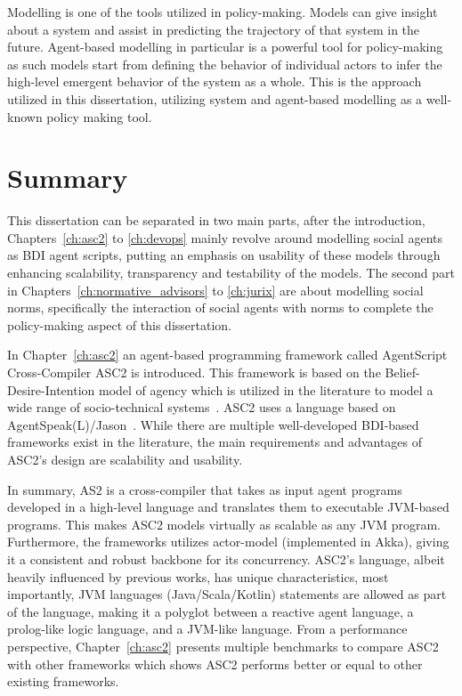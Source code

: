 Modelling is one of the tools utilized in policy-making. Models can give insight about a system and assist in predicting the trajectory of that system in the future. Agent-based modelling in particular is a powerful tool for policy-making as such models start from defining the behavior of individual actors to infer the high-level emergent behavior of the system as a whole. This is the approach utilized in this dissertation, utilizing system and agent-based modelling as a well-known policy making tool.


\section{Summary}

This dissertation can be separated in two main parts, after the introduction, Chapters~\ref{ch:asc2} to \ref{ch:devops} mainly revolve around modelling social agents as BDI agent scripts, putting an emphasis on usability of these models through enhancing scalability, transparency and testability of the models. The second part in Chapters~\ref{ch:normative_advisors} to \ref{ch:jurix} are about modelling social norms, specifically the interaction of social agents with norms to complete the policy-making aspect of this dissertation. 

In Chapter~\ref{ch:asc2} an agent-based programming framework called AgentScript Cross-Compiler ASC2 is introduced. This framework is based on the Belief-Desire-Intention model of agency which is utilized in the literature to model a wide range of socio-technical systems~\cite{...}. ASC2 uses a language based on AgentSpeak(L)/Jason~\cite{Jason}. While there are multiple well-developed BDI-based frameworks exist in the literature, the main requirements and advantages of ASC2's design are scalability and usability. 

In summary, AS2 is a cross-compiler that takes as input agent programs developed in a high-level language and translates them to executable JVM-based programs. This makes ASC2 models virtually as scalable as any JVM program. Furthermore, the frameworks utilizes actor-model (implemented in Akka), giving it a consistent and robust backbone for its concurrency. ASC2's language, albeit heavily influenced by previous works, has unique characteristics, most importantly, JVM languages (Java/Scala/Kotlin) statements are allowed as part of the language, making it a polyglot between a reactive agent language, a prolog-like logic language, and a JVM-like language. From a performance perspective, Chapter~\ref{ch:asc2} presents multiple benchmarks to compare ASC2 with other frameworks which shows ASC2 performs better or equal to other existing frameworks.

